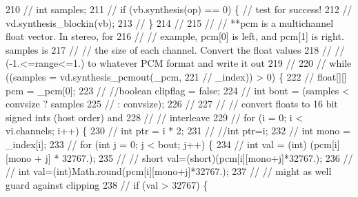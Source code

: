 \begin{DoxyCode}
210 \textcolor{comment}{//                              int samples;}
211 \textcolor{comment}{//                              if (vb.synthesis(op) == 0) \{ // test for success!}
212 \textcolor{comment}{//                                  vd.synthesis\_blockin(vb);}
213 \textcolor{comment}{//                              \}}
214 \textcolor{comment}{//}
215 \textcolor{comment}{//                              // **pcm is a multichannel float vector.  In stereo, for}
216 \textcolor{comment}{//                              // example, pcm[0] is left, and pcm[1] is right.  samples is}
217 \textcolor{comment}{//                              // the size of each channel.  Convert the float values}
218 \textcolor{comment}{//                              // (-1.<=range<=1.) to whatever PCM format and write it out}
219 \textcolor{comment}{//}
220 \textcolor{comment}{//                              while ((samples = vd.synthesis\_pcmout(\_pcm,}
221 \textcolor{comment}{//                                      \_index)) > 0) \{}
222 \textcolor{comment}{//                                  float[][] pcm = \_pcm[0];}
223 \textcolor{comment}{//                                  //boolean clipflag = false;}
224 \textcolor{comment}{//                                  int bout = (samples < convsize ? samples}
225 \textcolor{comment}{//                                          : convsize);}
226 \textcolor{comment}{//}
227 \textcolor{comment}{//                                  // convert floats to 16 bit signed ints (host order) and}
228 \textcolor{comment}{//                                  // interleave}
229 \textcolor{comment}{//                                  for (i = 0; i < vi.channels; i++) \{}
230 \textcolor{comment}{//                                      int ptr = i * 2;}
231 \textcolor{comment}{//                                      //int ptr=i;}
232 \textcolor{comment}{//                                      int mono = \_index[i];}
233 \textcolor{comment}{//                                      for (int j = 0; j < bout; j++) \{}
234 \textcolor{comment}{//                                          int val = (int) (pcm[i][mono + j] * 32767.);}
235 \textcolor{comment}{//                                          //                short val=(short)(pcm[i][mono+j]*32767.);}
236 \textcolor{comment}{//                                          //                int
       val=(int)Math.round(pcm[i][mono+j]*32767.);}
237 \textcolor{comment}{//                                          // might as well guard against clipping}
238 \textcolor{comment}{//                                          if (val > 32767) \{}

\end{DoxyCode}
